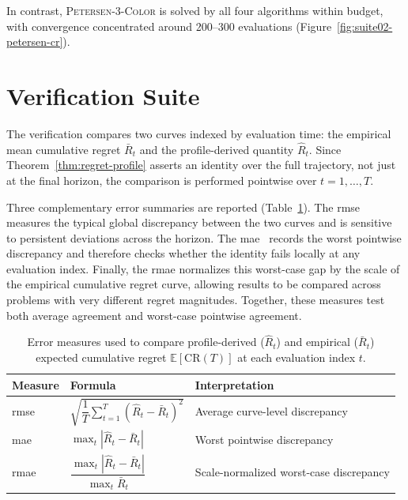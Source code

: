 In contrast, \textsc{Petersen-3-Color} is solved by all four
algorithms within budget, with convergence concentrated around
200--300 evaluations (Figure~\ref{fig:suite02-petersen-cr}).

\section{Verification Suite}
\label{sec:results:verification}
The verification compares two curves indexed by evaluation time: the
empirical mean cumulative regret $\bar R_t$ and the profile-derived
quantity $\hat R_t$. Since Theorem~\ref{thm:regret-profile} asserts an
identity over the full trajectory, not just at the final horizon, the
comparison is performed pointwise over $t=1,\ldots,T$.

Three complementary error summaries are reported
(Table~\ref{tab:vermeas}). The \acrfull{rmse} measures the
typical global discrepancy between the two curves and is sensitive to
persistent deviations across the horizon. The
\acrfull{mae}~\cite{higham2002acc} records the worst pointwise
discrepancy and therefore checks
whether the identity fails locally at any evaluation index. Finally, the
\acrfull{rmae} normalizes this worst-case gap
by the scale of the empirical cumulative regret curve, allowing results
to be compared across problems with very different regret magnitudes.
Together, these measures test both average agreement and worst-case
pointwise agreement.

\begin{table}[!htbp]
  \centering
  \begin{tabular}{lll}
    \toprule
    Measure & Formula & Interpretation \\
    \midrule
    \acrshort{rmse}
    & $\sqrt{\dfrac{1}{T}\sum_{t=1}^{T}\left(\hat{R}_t-\bar{R}_t\right)^2}$
    & Average curve-level discrepancy \\[1.4em]

    \acrshort{mae}
    & $\max_t \left|\hat{R}_t-\bar{R}_t\right|$
    & Worst pointwise discrepancy \\[0.8em]

    \acrshort{rmae}
    & $\dfrac{\max_t \left|\hat{R}_t-\bar{R}_t\right|}{\max_t \bar{R}_t}$
    & Scale-normalized worst-case discrepancy \\
    \bottomrule
  \end{tabular}
  \caption[Profile verification error measures]{Error measures used
    to compare profile-derived ($\hat{R}_t$) and
    empirical ($\bar{R}_t$) expected cumulative regret
    $\mathbb{E}[\mathrm{CR}(T)]$
  at each evaluation index $t$.}
  \label{tab:vermeas}
\end{table}

